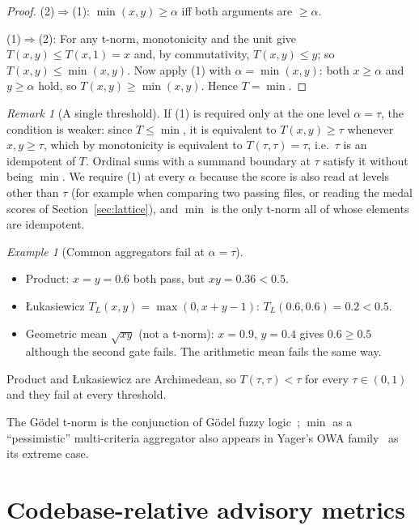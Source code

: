\documentclass[11pt]{article}
\theoremstyle{remark}
\newtheorem{remark}{Remark}
\newtheorem{example}{Example}
\begin{document}
\begin{proof}
(2)$\Rightarrow$(1): $\min(x,y) \ge \alpha$ iff both arguments are $\ge \alpha$.

(1)$\Rightarrow$(2): For any t-norm, monotonicity and the unit give
$T(x,y) \le T(x,1) = x$ and, by commutativity, $T(x,y) \le y$; so
$T(x,y) \le \min(x,y)$. Now apply (1) with $\alpha = \min(x,y)$: both
$x \ge \alpha$ and $y \ge \alpha$ hold, so $T(x,y) \ge \min(x,y)$. Hence
$T = \min$.
\end{proof}

\begin{remark}[A single threshold]
If (1) is required only at the one level $\alpha = \tau$, the condition is
weaker: since $T \le \min$, it is equivalent to $T(x,y) \ge \tau$ whenever
$x, y \ge \tau$, which by monotonicity is equivalent to $T(\tau, \tau) = \tau$,
i.e.\ $\tau$ is an idempotent of $T$. Ordinal sums with a summand boundary at
$\tau$ satisfy it without being $\min$. We require (1) at every $\alpha$ because
the score is also read at levels other than $\tau$ (for example when comparing
two passing files, or reading the medal scores of Section~\ref{sec:lattice}),
and $\min$ is the only t-norm all of whose elements are idempotent.
\end{remark}

\begin{example}[Common aggregators fail at $\alpha = \tau$]
\leavevmode
\begin{itemize}
  \item Product: $x = y = 0.6$ both pass, but $xy = 0.36 < 0.5$.
  \item Łukasiewicz $T_L(x,y) = \max(0, x + y - 1)$: $T_L(0.6, 0.6) = 0.2 < 0.5$.
  \item Geometric mean $\sqrt{xy}$ (not a t-norm): $x = 0.9$, $y = 0.4$ gives
        $0.6 \ge 0.5$ although the second gate fails. The arithmetic mean fails
        the same way.
\end{itemize}
Product and Łukasiewicz are Archimedean, so $T(\tau,\tau) < \tau$ for every
$\tau \in (0,1)$ and they fail at every threshold.
\end{example}

The Gödel t-norm is the conjunction of Gödel fuzzy logic~\cite{hajek1998};
$\min$ as a ``pessimistic'' multi-criteria aggregator also appears in
Yager's OWA family~\cite{yager1988} as its extreme case.

\section{Codebase-relative advisory metrics}\label{sec:advisory}
\end{document}

